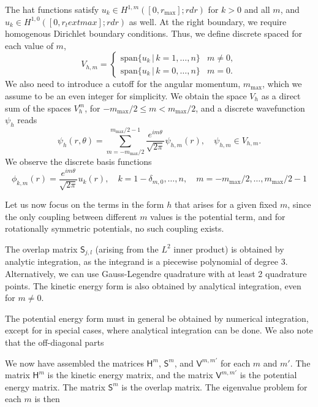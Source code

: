 \documentclass[12pt]{article}
\begin{document}
The hat functions satisfy $u_k \in H^{1,m}([0,r_\text{max}];r dr)$ for $k>0$ and all $m$, and $u_k \in H^{1, 0}([0,r_text{max}]; r dr)$ as well. At the right boundary, we require homogenous Dirichlet boundary conditions. Thus, we define discrete spaced for each value of $m$,
\begin{equation}
    V_{h,m} = \begin{cases} \text{span}\{ u_k \, | \, k=1,\ldots,n \} & m \neq 0, \\ \text{span}\{ u_k \, | \, k=0,\ldots,n \} & m = 0. \end{cases}
\end{equation}
We also need to introduce a cutoff for the angular momentum, $m_\text{max}$, which we assume to be an even integer for simplicity. We obtain the space $V_h$ as a direct sum of the spaces $V_h^m$, for $-m_\text{max}/2 \leq m < m_\text{max}/2$, and a discrete wavefunction $\psi_h$ reads
\begin{equation}
    \psi_h(r,\theta) = \sum_{m=-m_\text{max}/2}^{m_\text{max}/2-1} \frac{e^{im\theta}}{\sqrt{2\pi}}\psi_{h,m}(r), \quad \psi_{h,m} \in V_{h,m}.
\end{equation}
We observe the discrete basis functions
\begin{equation}
    \phi_{k,m}(r) = \frac{e^{im\theta}}{\sqrt{2\pi}} u_k(r), \quad k=1-\delta_{m,0},\ldots,n, \quad m = -m_\text{max}/2,\ldots,m_\text{max}/2-1
\end{equation}


Let us now focus on the terms in the form $h$ that arises for a given fixed $m$, since the only coupling between different $m$ values is the potential term, and for rotationally symmetric potentials, no such coupling exists.

The overlap matrix $\mathsf{S}_{j,l}$ (arising from the $L^2$ inner product) is obtained by analytic integration, as the integrand is a piecewise polynomial of degree 3. Alternatively, we can use Gauss-Legendre quadrature with at least 2 quadrature points. The kinetic energy form is also obtained by analytical integration, even for $m\neq 0$.

The potential energy form must in general be obtained by numerical integration, except for in special cases, where analytical integration can be done. We also note that the off-diagonal parts



We now have assembled the matrices $\mathsf{H}^m$, $\mathsf{S}^m$, and $\mathsf{V}^{m,m'}$ for each $m$ and $m'$. The matrix $\mathsf{H}^m$ is the kinetic energy matrix, and the matrix $\mathsf{V}^{m,m'}$ is the potential energy matrix. The matrix $\mathsf{S}^m$ is the overlap matrix. The eigenvalue problem for each $m$ is then
\end{document}
